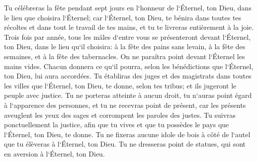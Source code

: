 \verse Tu célébreras la fête pendant sept jours en l`honneur de l`Éternel, ton Dieu, dans le lieu que choisira l`Éternel; car l`Éternel, ton Dieu, te bénira dans toutes tes récoltes et dans tout le travail de tes mains, et tu te livreras entièrement à la joie. 
\verse Trois fois par année, tous les mâles d`entre vous se présenteront devant l`Éternel, ton Dieu, dans le lieu qu`il choisira: à la fête des pains sans levain, à la fête des semaines, et à la fête des tabernacles. On ne paraîtra point devant l`Éternel les mains vides. 
\verse Chacun donnera ce qu`il pourra, selon les bénédictions que l`Éternel, ton Dieu, lui aura accordées. 
\verse Tu établiras des juges et des magistrats dans toutes les villes que l`Éternel, ton Dieu, te donne, selon tes tribus; et ils jugeront le peuple avec justice. 
\verse Tu ne porteras atteinte à aucun droit, tu n`auras point égard à l`apparence des personnes, et tu ne recevras point de présent, car les présents aveuglent les yeux des sages et corrompent les paroles des justes. 
\verse Tu suivras ponctuellement la justice, afin que tu vives et que tu possèdes le pays que l`Éternel, ton Dieu, te donne. 
\verse Tu ne fixeras aucune idole de bois à côté de l`autel que tu élèveras à l`Éternel, ton Dieu. 
\verse Tu ne dresseras point de statues, qui sont en aversion à l`Éternel, ton Dieu. 

